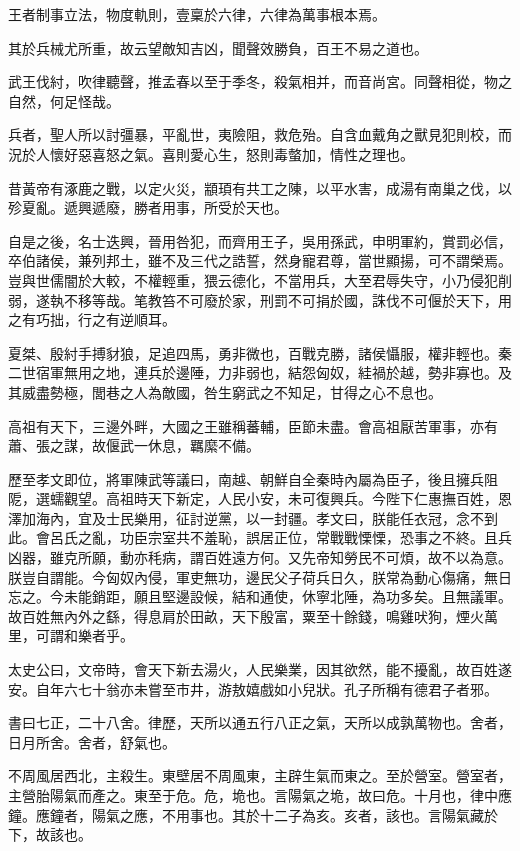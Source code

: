 王者制事立法，物度軌則，壹稟於六律，六律為萬事根本焉。

其於兵械尤所重，故云望敵知吉凶，聞聲效勝負，百王不易之道也。

武王伐紂，吹律聽聲，推孟春以至于季冬，殺氣相并，而音尚宮。同聲相從，物之自然，何足怪哉。

兵者，聖人所以討彊暴，平亂世，夷險阻，救危殆。自含血戴角之獸見犯則校，而況於人懷好惡喜怒之氣。喜則愛心生，怒則毒螫加，情性之理也。

昔黃帝有涿鹿之戰，以定火災，顓頊有共工之陳，以平水害，成湯有南巢之伐，以殄夏亂。遞興遞廢，勝者用事，所受於天也。

自是之後，名士迭興，晉用咎犯，而齊用王子，吳用孫武，申明軍約，賞罰必信，卒伯諸侯，兼列邦土，雖不及三代之誥誓，然身寵君尊，當世顯揚，可不謂榮焉。豈與世儒闇於大較，不權輕重，猥云德化，不當用兵，大至君辱失守，小乃侵犯削弱，遂執不移等哉。笔教笞不可廢於家，刑罰不可捐於國，誅伐不可偃於天下，用之有巧拙，行之有逆順耳。

夏桀、殷紂手搏豺狼，足追四馬，勇非微也，百戰克勝，諸侯懾服，權非輕也。秦二世宿軍無用之地，連兵於邊陲，力非弱也，結怨匈奴，絓禍於越，勢非寡也。及其威盡勢極，閭巷之人為敵國，咎生窮武之不知足，甘得之心不息也。

高祖有天下，三邊外畔，大國之王雖稱蕃輔，臣節未盡。會高祖厭苦軍事，亦有蕭、張之謀，故偃武一休息，羈縻不備。

歷至孝文即位，將軍陳武等議曰，南越、朝鮮自全秦時內屬為臣子，後且擁兵阻阸，選蠕觀望。高祖時天下新定，人民小安，未可復興兵。今陛下仁惠撫百姓，恩澤加海內，宜及士民樂用，征討逆黨，以一封疆。孝文曰，朕能任衣冠，念不到此。會呂氏之亂，功臣宗室共不羞恥，誤居正位，常戰戰慄慄，恐事之不終。且兵凶器，雖克所願，動亦秏病，謂百姓遠方何。又先帝知勞民不可煩，故不以為意。朕豈自謂能。今匈奴內侵，軍吏無功，邊民父子荷兵日久，朕常為動心傷痛，無日忘之。今未能銷距，願且堅邊設候，結和通使，休寧北陲，為功多矣。且無議軍。故百姓無內外之繇，得息肩於田畝，天下殷富，粟至十餘錢，鳴雞吠狗，煙火萬里，可謂和樂者乎。

太史公曰，文帝時，會天下新去湯火，人民樂業，因其欲然，能不擾亂，故百姓遂安。自年六七十翁亦未嘗至市井，游敖嬉戲如小兒狀。孔子所稱有德君子者邪。

書曰七正，二十八舍。律歷，天所以通五行八正之氣，天所以成孰萬物也。舍者，日月所舍。舍者，舒氣也。

不周風居西北，主殺生。東壁居不周風東，主辟生氣而東之。至於營室。營室者，主營胎陽氣而產之。東至于危。危，垝也。言陽氣之垝，故曰危。十月也，律中應鐘。應鐘者，陽氣之應，不用事也。其於十二子為亥。亥者，該也。言陽氣藏於下，故該也。

